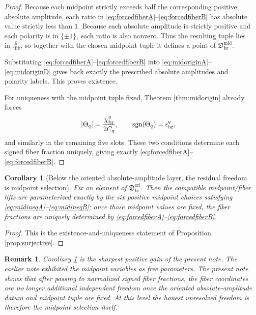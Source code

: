 \documentclass[11pt]{article}
\newcommand{\OriginSector}{\mathfrak D_{\mathrm{br}}^{\mathrm{ori}}}
\newcommand{\AbsReadAmp}{\chi_{\mathrm{br}}^{q}}
\newcommand{\PolRead}{\epsilon_{\mathrm{br}}^{q}}
\newcommand{\MidFiberSector}{\mathfrak D_{\mathrm{br}}^{\mathrm{mid}}}
\newcommand{\MidRead}{C_{q}}
\newcommand{\FiberRead}{\Theta_{q}}
\newcommand{\FiberDom}{\mathbb I_{\mathrm{fib}}}
\newtheorem{remark}{Remark}
\newtheorem{corollary}{Corollary}
\begin{document}
\begin{proof}
Because each midpoint strictly exceeds half the corresponding positive absolute amplitude, each ratio in \eqref{eq:forcedfiberA}--\eqref{eq:forcedfiberB} has absolute value strictly less than \(1\). Because each absolute amplitude is strictly positive and each polarity is in \(\{\pm1\}\), each ratio is also nonzero. Thus the resulting tuple lies in \(\FiberDom^{6}\), so together with the chosen midpoint tuple it defines a point of \(\MidFiberSector\).

Substituting \eqref{eq:forcedfiberA}--\eqref{eq:forcedfiberB} into \eqref{eq:midoriginA}--\eqref{eq:midoriginD} gives back exactly the prescribed absolute amplitudes and polarity labels. This proves existence.

For uniqueness with the midpoint tuple fixed, Theorem \ref{thm:midorigin} already forces
\[
\abs{\FiberRead}=\frac{\AbsReadAmp}{2\MidRead},
\qquad
\operatorname{sgn}(\FiberRead)=\PolRead,
\]
and similarly in the remaining five slots. These two conditions determine each signed fiber fraction uniquely, giving exactly \eqref{eq:forcedfiberA}--\eqref{eq:forcedfiberB}.
\end{proof}

\begin{corollary}[Below the oriented absolute-amplitude layer, the residual freedom is midpoint selection]
\label{cor:midpoints}
Fix an element of \(\OriginSector\). Then the compatible midpoint/fiber lifts are parameterized exactly by the six positive midpoint choices satisfying \eqref{eq:midineqA}--\eqref{eq:midineqB}; once those midpoint values are fixed, the fiber fractions are uniquely determined by \eqref{eq:forcedfiberA}--\eqref{eq:forcedfiberB}.
\end{corollary}

\begin{proof}
This is the existence-and-uniqueness statement of Proposition \ref{prop:surjective}.
\end{proof}

\begin{remark}
Corollary \ref{cor:midpoints} is the sharpest positive gain of the present note. The earlier note exhibited the midpoint variables as free parameters. The present note shows that after passing to normalized signed fiber fractions, the fiber coordinates are no longer additional independent freedom once the oriented absolute-amplitude datum and midpoint tuple are fixed. At this level the honest unresolved freedom is therefore the midpoint selection itself.
\end{remark}
\end{document}

